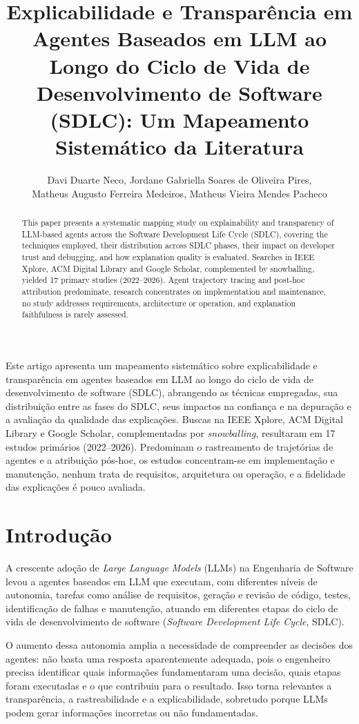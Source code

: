 \documentclass[12pt]{article}
\title{Explicabilidade e Transparência em Agentes Baseados em LLM ao Longo
  do Ciclo de Vida de Desenvolvimento de Software (SDLC): Um Mapeamento
  Sistemático da Literatura}
\author{Davi Duarte Neco, Jordane Gabriella Soares de Oliveira Pires,\\
  Matheus Augusto Ferreira Medeiros, Matheus Vieira Mendes Pacheco}
\begin{document}
\maketitle

\begin{abstract}
  This paper presents a systematic mapping study on explainability and
transparency of LLM-based agents across the Software Development Life Cycle
(SDLC), covering the techniques employed, their distribution across SDLC phases,
their impact on developer trust and debugging, and how explanation quality is
evaluated. Searches in IEEE Xplore, ACM Digital Library and Google Scholar,
complemented by snowballing, yielded 17 primary studies (2022--2026). Agent
trajectory tracing and post-hoc attribution predominate, research concentrates
on implementation and maintenance, no study addresses requirements,
architecture or operation, and explanation faithfulness is rarely assessed.
\end{abstract}

\begin{resumo}
  Este artigo apresenta um mapeamento sistemático sobre explicabilidade e
transparência em agentes baseados em LLM ao longo do ciclo de vida de
desenvolvimento de software (SDLC), abrangendo as técnicas empregadas, sua
distribuição entre as fases do SDLC, seus impactos na confiança e na depuração e
a avaliação da qualidade das explicações. Buscas na IEEE Xplore, ACM Digital
Library e Google Scholar, complementadas por \textit{snowballing}, resultaram em
17 estudos primários (2022--2026). Predominam o rastreamento de trajetórias de
agentes e a atribuição pós-hoc, os estudos concentram-se em implementação e
manutenção, nenhum trata de requisitos, arquitetura ou operação, e a fidelidade
das explicações é pouco avaliada.
\end{resumo}

\section{Introdução}

A crescente adoção de \textit{Large Language Models} (LLMs) na Engenharia de
Software levou a agentes baseados em LLM que executam, com diferentes níveis de
autonomia, tarefas como análise de requisitos, geração e revisão de código,
testes, identificação de falhas e manutenção, atuando em diferentes etapas do
ciclo de vida de desenvolvimento de software (\textit{Software Development Life
Cycle}, SDLC).

O aumento dessa autonomia amplia a necessidade de compreender as decisões dos
agentes: não basta uma resposta aparentemente adequada, pois o engenheiro
precisa identificar quais informações fundamentaram uma decisão, quais etapas
foram executadas e o que contribuiu para o resultado. Isso torna relevantes a
transparência, a rastreabilidade e a explicabilidade, sobretudo porque LLMs
podem gerar informações incorretas ou não fundamentadas.
\end{document}
